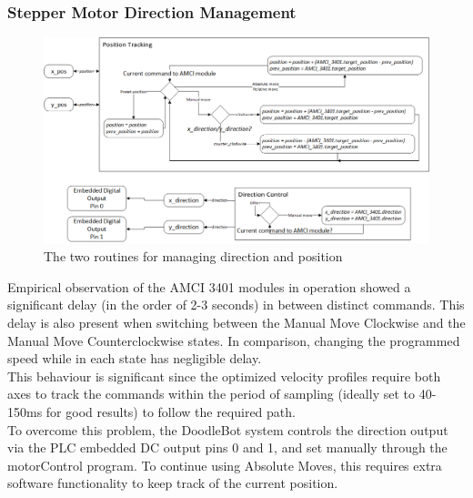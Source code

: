 		\subsubsection{Stepper Motor Direction Management}

	\begin{figure}[htbp!]
		\includegraphics[width=\textwidth]{figures/cncMachine/position_direction}
		\caption{The two routines for managing direction and position}
		\label{fig:Direction and Positional Tracking}
	\end{figure}
	
			Empirical observation of the AMCI 3401 modules in operation showed a significant delay (in the order of 2-3 seconds) in between distinct commands. This delay is also present when switching between the Manual Move Clockwise and the Manual Move Counterclockwise states. In comparison, changing the programmed speed while in each state has negligible delay.\\
			
			This behaviour is significant since the optimized velocity profiles require both axes to track the commands within the period of sampling (ideally set to 40-150ms for good results) to follow the required path.\\
			
			To overcome this problem, the DoodleBot system controls the direction output via the PLC embedded DC output pins 0 and 1, and set manually through the motorControl program. To continue using Absolute Moves, this requires extra software functionality to keep track of the current position.
			
